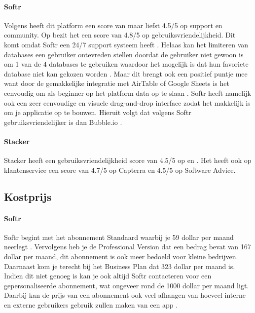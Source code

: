 \paragraph{Softr}
Volgens \textcite{Code2023} heeft dit platform een score van maar liefst 4.5/5 op support en community. 
Op \textcite{Capterra} bezit het een score van 4.8/5 op gebruiksvriendelijkheid.
Dit komt omdat Softr een 24/7 support systeem heeft \autocite{Youssef2023}. 
Helaas kan het limiteren van databases een gebruiker ontevreden stellen doordat de gebruiker niet gewoon is om 1 van de 4 databases te gebruiken 
waardoor het mogelijk is dat hun favoriete database niet kan gekozen worden \autocite{Frater2024}. 
Maar dit brengt ook een positief puntje mee want door de gemakkelijke integratie met AirTable of Google Sheets is het eenvoudig om als beginner op het platform data op te slaan \autocite{Code2023}. Softr heeft namelijk ook een zeer eenvoudige en visuele drag-and-drop interface zodat het makkelijk is om je applicatie op te bouwen. Hieruit volgt dat volgens \textcite{Youssef2023} Softr gebruiksvriendelijker is dan Bubble.io .
\paragraph{Stacker}
Stacker heeft een gebruiksvriendelijkheid score van 4.5/5 op \textcite{Capterra}
en \textcite{Advice}. Het heeft ook op klantenservice een score van 4.7/5 op Capterra en 4.5/5 op Software Advice.

\subsection{Kostprijs}%
\label{subsec:kostprijs}

\paragraph{Softr}
Softr begint met het abonnement Standaard waarbij je 59 dollar per maand neerlegt \autocite{Frater2024}
\autocite{Youssef2023}. Vervolgens heb je de Professional Version dat een bedrag bevat van 167 dollar per maand, 
dit abonnement is ook meer bedoeld voor kleine bedrijven. Daarnaast kom je terecht bij het Business Plan dat 323 dollar per maand is. 
Indien dit niet genoeg is kan je ook altijd Softr contacteren voor een gepersonaliseerde abonnement, wat ongeveer rond de 1000 dollar per maand ligt. 
Daarbij kan de prijs van een abonnement ook veel afhangen van hoeveel interne en externe gebruikers gebruik zullen maken van een app \autocite{Frater2024}.
